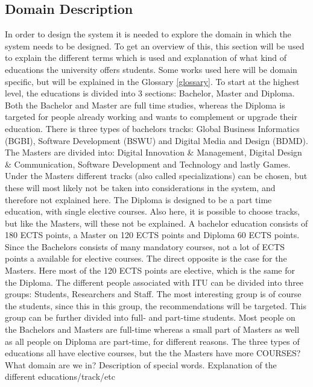 \subsection{Domain Description}
In order to design the system it is needed to explore the domain in which the system needs to be designed. To get an overview of this, this section will be used to explain the different terms which is used and explanation of what kind of educations the university offers students. Some works used here will be domain specific, but will be explained in the Glossary \ref{glossary}.
To start at the highest level, the educations is divided into 3 sections: Bachelor, Master and Diploma. Both the Bachelor and Master are full time studies, whereas the Diploma is targeted for people already working and wants to complement or upgrade their education. There is three types of bachelors tracks: Global Business Informatics (BGBI), Software Development (BSWU) and Digital Media and Design (BDMD). The Masters are divided into: Digital Innovation \& Management, Digital Design \& Communication, Software Development and Technology and lastly Games. Under the Masters different tracks (also called specializations) can be chosen, but these will most likely not be taken into considerations in the system, and therefore not explained here. The Diploma is designed to be a part time education, with single elective courses. Also here, it is possible to choose tracks, but like the Masters, will these not be explained. 
A bachelor education consists of 180 ECTS points, a Master on 120 ECTS points and Diploma 60 ECTS points. Since the Bachelors consists of many mandatory courses, not a lot of ECTS points a available for elective courses. The direct opposite is the case for the Masters. Here most of the 120 ECTS points are elective, which is the same for the Diploma. 
The different people associated with ITU can be divided into three groups: Students, Researchers and Staff. The most interesting group is of course the students, since this in this group, the recommendations will be targeted. This group can be further divided into full- and part-time students. Most people on the Bachelors and Masters are full-time whereas a small part of Masters as well as all people on Diploma are part-time, for different reasons. 
The three types of educations all have elective courses, but the the Masters have more 
COURSES?
What domain are we in? Description of special words. Explanation of the different educations/track/etc
